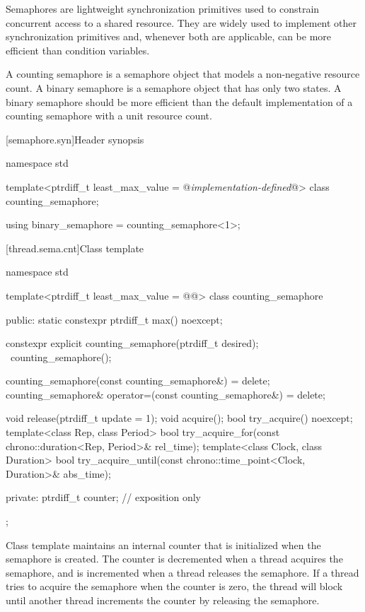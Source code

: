 \pnum
Semaphores are lightweight synchronization primitives
used to constrain concurrent access to a shared resource.
They are widely used to implement other synchronization primitives and,
whenever both are applicable, can be more efficient than condition variables.

\pnum
A counting semaphore is a semaphore object
that models a non-negative resource count.
A binary semaphore is a semaphore object that has only two states.
A binary semaphore should be more efficient than
the default implementation of a counting semaphore with a unit resource count.

[semaphore.syn]{Header  synopsis}
%

\begin{codeblock}
namespace std {
  template<ptrdiff_t least_max_value = @\textrm{\textit{implementation-defined}}@>
    class counting_semaphore;

  using binary_semaphore = counting_semaphore<1>;
}
\end{codeblock}

[thread.sema.cnt]{Class template }

\begin{codeblock}
namespace std {
  template<ptrdiff_t least_max_value = @\textrm{\textit{}}@>
  class counting_semaphore {
  public:
    static constexpr ptrdiff_t max() noexcept;

    constexpr explicit counting_semaphore(ptrdiff_t desired);
    ~counting_semaphore();

    counting_semaphore(const counting_semaphore&) = delete;
    counting_semaphore& operator=(const counting_semaphore&) = delete;

    void release(ptrdiff_t update = 1);
    void acquire();
    bool try_acquire() noexcept;
    template<class Rep, class Period>
      bool try_acquire_for(const chrono::duration<Rep, Period>& rel_time);
    template<class Clock, class Duration>
      bool try_acquire_until(const chrono::time_point<Clock, Duration>& abs_time);

  private:
    ptrdiff_t counter; // exposition only
  };
}
\end{codeblock}

\pnum
Class template  maintains an internal counter
that is initialized when the semaphore is created.
The counter is decremented when a thread acquires the semaphore, and
is incremented when a thread releases the semaphore.
If a thread tries to acquire the semaphore when the counter is zero,
the thread will block
until another thread increments the counter by releasing the semaphore.

